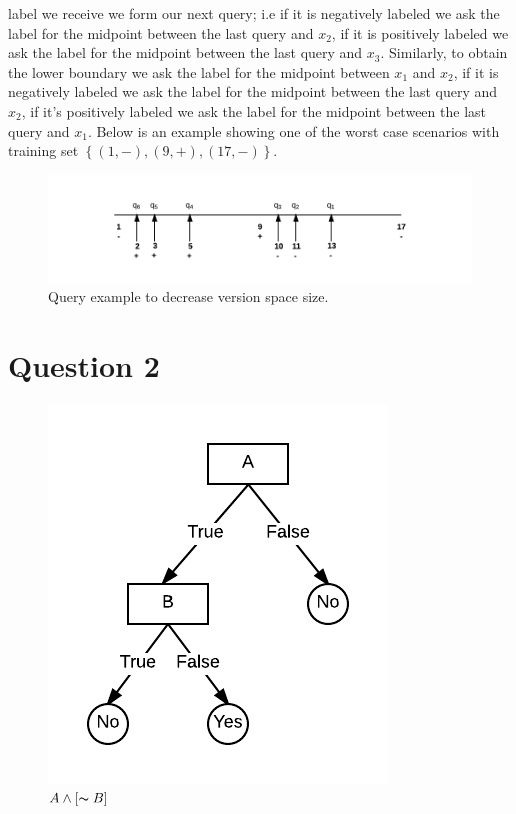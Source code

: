\documentclass[12pt]{article}
\begin{document}
\begin{enumerate}[(a)]
label we receive we form our next query; i.e if it is negatively
labeled we ask the label for the midpoint between the last query and
$x_2$, if it is positively labeled we ask the label for the midpoint
between the last query and $x_3$. Similarly, to obtain the lower
boundary we ask the label for the midpoint between $x_1$ and $x_2$, if
it is negatively labeled we ask the label for the midpoint between the
last query and $x_2$, if it's positively labeled we ask the label for
the midpoint between the last query and $x_1$. Below is an example
showing one of the worst case scenarios with training set $\left\{
\left(1, - \right), \left(9, + \right), \left(17, - \right)\right\}$.
\begin{figure}[H]
  \centering
  \includegraphics[width=\linewidth]{img/hw1_1d}
  \caption{Query example to decrease version space size.}
\end{figure}
\end{enumerate}

\section{Question 2}
\begin{figure}[H]
  \centering
  \includegraphics[scale=0.5]{img/hw1_2a}
  \caption{$A \wedge \left[ \thicksim B \right]$}
\end{figure}
\end{document}
